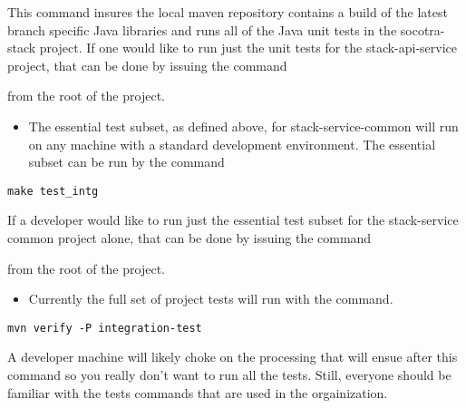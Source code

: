 \begin{Shaded}
\begin{Highlighting}[]
\end{Highlighting}
\end{Shaded}

This command insures the local maven repository contains a build of the
latest branch specific Java libraries and runs all of the Java unit
tests in the socotra-stack project. If one would like to run just the
unit tests for the stack-api-service project, that can be done by
issuing the command

\begin{Shaded}
\begin{Highlighting}[]
\end{Highlighting}
\end{Shaded}

from the root of the project.

\begin{itemize}
\tightlist
\item
  The essential test subset, as defined above, for stack-service-common
  will run on any machine with a standard development environment. The
  essential subset can be run by the command
\end{itemize}

\begin{verbatim}
make test_intg
\end{verbatim}

If a developer would like to run just the essential test subset for the
stack-service common project alone, that can be done by issuing the
command

\begin{Shaded}
\begin{Highlighting}[]
\end{Highlighting}
\end{Shaded}

from the root of the project.

\begin{itemize}
\tightlist
\item
  Currently the full set of project tests will run with the command.
\end{itemize}

\begin{verbatim}
mvn verify -P integration-test
\end{verbatim}

A developer machine will likely choke on the processing that will ensue
after this command so you really don't want to run all the tests. Still,
everyone should be familiar with the tests commands that are used in the
orgainization.
